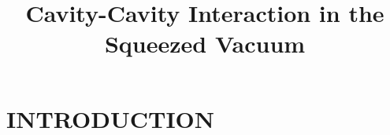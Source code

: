 \documentclass{article}
\begin{document}
\title{Cavity-Cavity Interaction in the Squeezed Vacuum}
\maketitle 


\section{INTRODUCTION}
\end{document}
